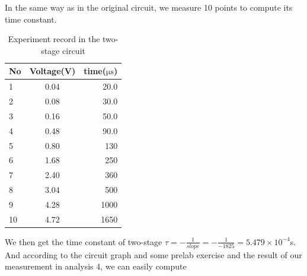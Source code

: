 \phantom{ } In the same way as in the original circuit, we measure 10 points to compute its time constant.
\begin{table}[!htbp]\centering
	\caption{Experiment record in the two-stage circuit}
	\renewcommand\arraystretch{1.5}
	\begin{tabular}{lcr}
		\toprule
		No		&Voltage(V)	&time($\mathrm{\mu s}$)	\\
		\midrule
		1		&0.04		&20.0		\\

		2		&0.08		&30.0		\\
		
		3		&0.16		&50.0		\\
		
		4		&0.48		&90.0		\\
		
		5		&0.80		&130		\\
		
		6		&1.68		&250		\\
		
		7		&2.40		&360		\\
		
		8		&3.04		&500		\\
		
		9		&4.28		&1000		\\
		
		10		&4.72		&1650		\\
		\bottomrule
	\end{tabular}
\end{table}
\phantom{ } We then get the time constant of two-stage 
$\tau = -\frac{1}{slope} = -\frac{1}{-1825} = 5.479\times10^{-4}$s.\\ And according to the circuit graph and some prelab exercise and the result of our measurement in analysis 4, we can easily compute
